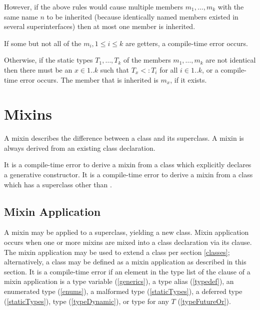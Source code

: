 \documentclass[makeidx]{article}
\begin{document}

\LMHash{}%
However, if the above rules would cause multiple members $m_1, \ldots, m_k$ with the same name $n$ to be inherited (because identically named members existed in several superinterfaces) then at most one member is inherited.

\LMHash{}%
If some but not all of the $m_i, 1 \le i \le k$ are getters, a compile-time error occurs.

\LMHash{}%
Otherwise, if the static types $T_1, \ldots, T_k$ of the members $m_1, \ldots, m_k$ are not identical then there must be an $x \in 1 .. k$ such that $T_x <: T_i$ for all $i \in 1 .. k$,
or a compile-time error occurs.
The member that is inherited  is $m_x$, if it exists.


\section{Mixins}

\LMHash{}%
A mixin describes the difference between a class and its superclass.
A mixin is always derived from an existing class declaration.

\LMHash{}%
It is a compile-time error to derive a mixin from a class which explicitly declares a generative constructor.
It is a compile-time error to derive a mixin from a class which has a superclass other than .



\subsection{Mixin Application}

\LMHash{}%
A mixin may be applied to a superclass, yielding a new class.
Mixin application occurs when one or more mixins are mixed into a class declaration via its \WITH{} clause.
The mixin application may be used to extend a class per section \ref{classes};
alternatively, a class may be defined as a mixin application as described in this section.
It is a compile-time error if an element in the type list of the \WITH{} clause of a mixin application is
a type variable (\ref{generics}), a type alias (\ref{typedef}),
an enumerated type (\ref{enums}), a malformed type (\ref{staticTypes}),
a deferred type (\ref{staticTypes}), type \DYNAMIC{} (\ref{typeDynamic}),
or type  for any $T$ (\ref{typeFutureOr}).
\end{document}

